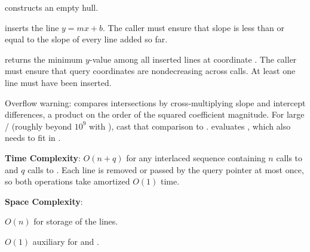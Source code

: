 \begin{compactitem}
  \item {} constructs an empty hull.
  \item {} inserts the line $y = mx + b$. The caller must ensure that slope  is less than or equal to the slope of every line added so far.
  \item {} returns the minimum $y$-value among all inserted lines at coordinate . The caller must ensure that query coordinates are nondecreasing across calls. At least one line must have been inserted.
\end{compactitem}

Overflow warning:  compares intersections by cross-multiplying slope and intercept differences, a product on the order of the squared coefficient magnitude. For large / (roughly beyond $10^9$ with ), cast that comparison to .  evaluates , which also needs to fit in .

\textbf{Time Complexity}: $O(n + q)$ for any interlaced sequence containing $n$ calls to  and $q$ calls to . Each line is removed or passed by the query pointer at most once, so both operations take amortized $O(1)$ time.

\textbf{Space Complexity}:
\begin{compactitem}
  \item $O(n)$ for storage of the lines.
  \item $O(1)$ auxiliary for  and .
\end{compactitem}

